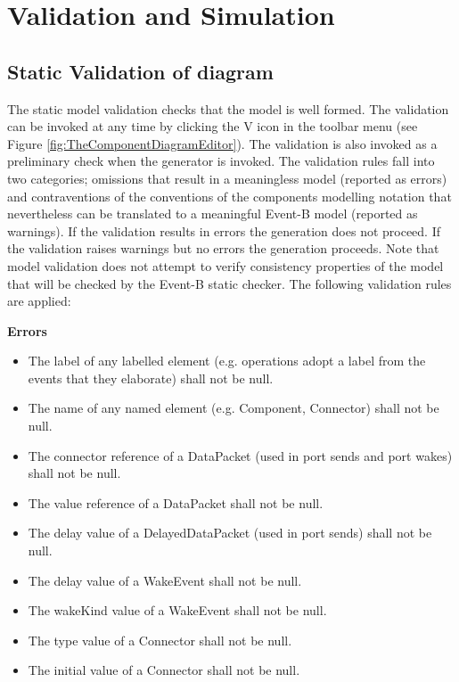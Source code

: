 \section{Validation and Simulation}
\label{sec:component_diagrams-validation}

\subsection{Static Validation of diagram}
The static model validation checks that the model is well formed. The validation can be invoked at any time by clicking the V icon in the toolbar menu (see Figure \ref{fig:TheComponentDiagramEditor}). The validation is also invoked as a preliminary check when the generator is invoked. The validation rules fall into two categories; omissions that result in a meaningless model (reported as errors) and contraventions of the conventions of the components modelling notation that nevertheless can be translated to a meaningful Event-B model (reported as warnings). If the validation results in errors the generation does not proceed. If the validation raises warnings but no errors the generation proceeds. Note that model validation does not attempt to verify consistency properties of the model that will be checked by the Event-B static checker. The following validation rules are applied:

\textbf{Errors}

\begin{itemize}
\item The label of any labelled element (e.g. operations adopt a label from the events that they elaborate) shall not be null.
\item The name of any named element (e.g. Component, Connector) shall not be null.
\item The connector reference of a DataPacket (used in port sends and port wakes) shall not be null.
\item The value reference of a DataPacket shall not be null.
\item The delay value of a DelayedDataPacket (used in port sends) shall not be null.
\item The delay value of a WakeEvent shall not be null.
\item The wakeKind value of a WakeEvent shall not be null.
\item The type value of a Connector shall not be null.
\item The initial value of a Connector shall not be null.
\end{itemize}


